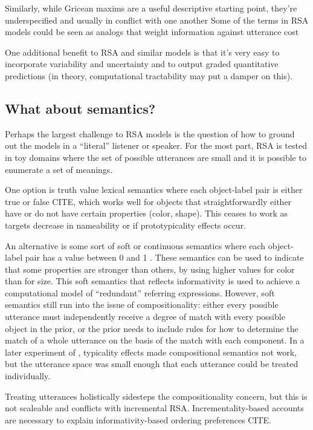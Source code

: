 \documentclass[]{article}
\begin{document}
Similarly, while Gricean maxims are a useful descriptive starting point, they're underspecified and usually in conflict with one another %
Some of the terms in RSA models could be seen as analogs that weight information against utterance cost %

One additional benefit to RSA and similar models is that it's very easy to incorporate variability and uncertainty and to output graded quantitative predictions (in theory, computational tractability may put a damper on this). 

\subsection{What about semantics?}

Perhaps the largest challenge to RSA models is the question of how to ground out the models in a ``literal'' listener or speaker. For the most part, RSA is tested in toy domains where the set of possible utterances are small and it is possible to enumerate a set of meanings.

One option is truth value lexical semantics where each object-label pair is either true or false CITE, which works well for objects that straightforwardly either have or do not have certain properties (color, shape). This ceases to work as targets decrease in nameability or if prototypicality effects occur. 

An alternative is some sort of soft or continuous semantics where each object-label pair has a value between 0 and 1 \cite{degen20200406}. These semantics can be used to indicate that some properties are stronger than others, by using higher values for color than for size. This soft semantics that reflects informativity is used to achieve a computational model of ``redundant'' referring expressions. %
However, soft semantics still run into the issue of compositionality: either every possible utterance must independently receive a degree of match with every possible object in the prior, or the prior needs to include rules for how to determine the match of a whole utterance on the basis of the match with each component. 
In a later experiment of \cite{degen20200406}, typicality effects made compositional semantics not work, but the utterance space was small enough that each utterance could be treated individually. 

Treating utterances holistically sidesteps the compositionality concern, but this is not scaleable and conflicts with incremental RSA. Incrementality-based accounts are necessary to explain informativity-based ordering preferences CITE. 
\end{document}
